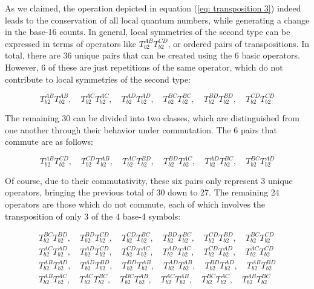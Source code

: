 \documentclass{article}
\begin{document}
As we claimed, the operation depicted in equation (\ref{eq: transposition 3}) indeed leads to the conservation of all local quantum numbers, while generating a change in the base-16 counts. In general, local symmetries of the second type can be expressed in terms of operators like $T^{AB}_{b2}T^{CD}_{b2}$, or ordered pairs of transpositions. In total, there are 36 unique pairs that can be created using the 6 basic operators. However, 6 of these are just repetitions of the same operator, which do not contribute to local symmetries of the second type:

\begin{equation}
    T^{AB}_{b2}T^{AB}_{b2}, \quad T^{AC}_{b2}T^{AC}_{b2}, \quad T^{AD}_{b2}T^{AD}_{b2}, \quad T^{BC}_{b2}T^{BC}_{b2}, \quad T^{BD}_{b2}T^{BD}_{b2}, \quad T^{CD}_{b2}T^{CD}_{b2}
\end{equation}

The remaining 30 can be divided into two classes, which are distinguished from one another through their behavior under commutation. The 6 pairs that commute are as follows:

\begin{equation}
    T^{AB}_{b2}T^{CD}_{b2}, \quad T^{CD}_{b2}T^{AB}_{b2}, \quad T^{AC}_{b2}T^{BD}_{b2}, \quad T^{BD}_{b2}T^{AC}_{b2}, \quad T^{AD}_{b2}T^{BC}_{b2}, \quad T^{BC}_{b2}T^{AD}_{b2}
    \label{eq: commuttative operators}
\end{equation}

Of course, due to their commutativity, these six pairs only represent 3 unique operators, bringing the previous total of 30 down to 27. The remaining 24 operators are those which do not commute, each of which involves the transposition of only 3 of the 4 base-4 symbols:

\begin{equation}
\begin{array}{cc}
     T^{BC}_{b2}T^{BD}_{b2}, \quad T^{BD}_{b2}T^{CD}_{b2}, \quad T^{CD}_{b2}T^{BC}_{b2}, \quad T^{BD}_{b2}T^{BC}_{b2}, \quad T^{CD}_{b2}T^{BD}_{b2}, \quad T^{BC}_{b2}T^{CD}_{b2}\\
     T^{AC}_{b2}T^{AD}_{b2}, \quad T^{AD}_{b2}T^{CD}_{b2}, \quad T^{CD}_{b2}T^{AC}_{b2}, \quad T^{AD}_{b2}T^{AC}_{b2}, \quad T^{CD}_{b2}T^{AD}_{b2}, \quad T^{AC}_{b2}T^{CD}_{b2}\\
     T^{AB}_{b2}T^{AD}_{b2}, \quad T^{AD}_{b2}T^{BD}_{b2}, \quad T^{BD}_{b2}T^{AB}_{b2}, \quad T^{AD}_{b2}T^{AB}_{b2}, \quad T^{BD}_{b2}T^{AD}_{b2}, \quad T^{AB}_{b2}T^{BD}_{b2}\\
     T^{AB}_{b2}T^{AC}_{b2}, \quad T^{AC}_{b2}T^{BC}_{b2}, \quad T^{BC}_{b2}T^{AB}_{b2}, \quad T^{AC}_{b2}T^{AB}_{b2}, \quad T^{BC}_{b2}T^{AC}_{b2}, \quad T^{AB}_{b2}T^{BC}_{b2}
\end{array}
\label{eq: non-commutative operators}
\end{equation}
\end{document}
